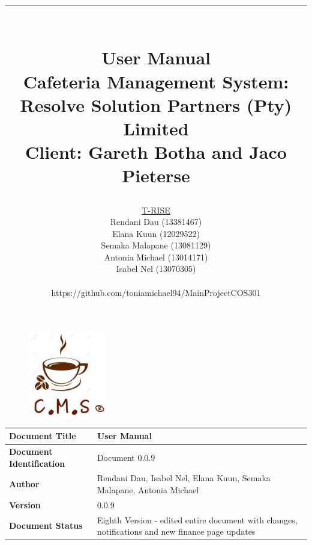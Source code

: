 \documentclass[a4paper,12pt]{report}
\title{ \rule{\textwidth}{1pt}  \\ \Huge User Manual \\ 
	\Large Cafeteria Management System: Resolve Solution Partners (Pty) Limited \\
	\small Client: Gareth Botha and Jaco Pieterse}
\author{ 
         \underline{T-RISE}\\
          Rendani Dau (13381467) \\
	Elana Kuun (12029522) \\
	Semaka Malapane (13081129) \\
	Antonia Michael (13014171) \\
	Isabel Nel (13070305) \\ \\
	https://github.com/toniamichael94/MainProjectCOS301 \\ }
\date{\today \\ \rule{\textwidth}{1pt}}
\begin{document}
\maketitle
\break

\tableofcontents
\break

\begin{figure}[H]
  \centering
   \includegraphics[width=0.3\textwidth]{../images/cmslogo.jpg} 
\end{figure}
 \begin{tabu} to 0.8\textwidth { | X[l] | X[l] | }
 \hline
 \textbf{Document Title} & User Manual \\
 \hline
 \textbf{Document Identification}  & Document 0.0.9  \\
 \hline
 \textbf{Author}  & Rendani Dau, Isabel Nel, Elana Kuun, Semaka Malapane, Antonia Michael \\
 \hline
 \textbf{Version} & 0.0.9 \\
 \hline
 \textbf{Document Status} & Eighth Version - edited entire document with changes, notifications and new finance page updates\\
 \hline
 \end{tabu}
\end{document}
